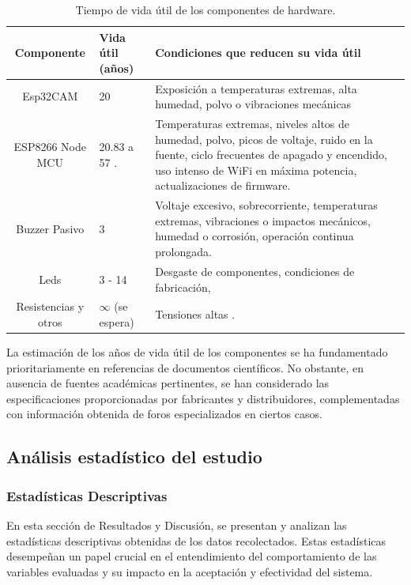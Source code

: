 \documentclass[a4paper,fleqn]{cas-sc}
\begin{document}
				\begin{table}[h]
					\centering
					\caption{Tiempo de vida útil de los componentes de hardware.}
					\label{tab:ShelfLife}
					\begin{tabularx}{\textwidth}{cXX}
						\toprule
						\textbf{Componente} & \textbf{Vida útil (años)} & Condiciones que reducen su vida útil\\
						\midrule
						Esp32CAM & 20 \citep{Espressif2022ESP32-CAM,Espressif2022ESP32Forum} & Exposición a temperaturas extremas, alta humedad, polvo o vibraciones mecánicas\\
						ESP8266 Node MCU & 20.83 \citep{Amri2018Improving} a 57 \citep{Ardumotica2023,Espressif2022ESP32Forum}. & Temperaturas extremas, niveles altos de humedad, polvo, picos de voltaje, ruido en la fuente, ciclo frecuentes de apagado y encendido, uso intenso de WiFi en máxima potencia, actualizaciones de firmware.\\
						Buzzer Pasivo & 3 \citep{HuawhaElectronics} & Voltaje excesivo, sobrecorriente, temperaturas extremas, vibraciones o impactos mecánicos, humedad o corrosión, operación continua prolongada. \\
						Leds & 3 \citep{Casamayor2015} - 14 \citep{Cary,GreenLighting2024} & Desgaste de componentes, condiciones de fabricación, \\
						Resistencias y otros & $\infty$ (se espera) & Tensiones altas \citep{Simon2017Evolution}. \\
						\bottomrule
					\end{tabularx}
				\end{table}
				La estimación de los años de vida útil de los componentes se ha fundamentado prioritariamente en referencias de documentos científicos. No obstante, en ausencia de fuentes académicas pertinentes, se han considerado las especificaciones proporcionadas por fabricantes y distribuidores, complementadas con información obtenida de foros especializados en ciertos casos.
				
		\subsection{Análisis estadístico del estudio}
				\subsubsection{Estadísticas Descriptivas}
				En esta sección de Resultados y Discusión, se presentan y analizan las estadísticas descriptivas obtenidas de los datos recolectados. Estas estadísticas desempeñan un papel crucial en el entendimiento del comportamiento de las variables evaluadas y su impacto en la aceptación y efectividad del sistema.
				
\end{document}
